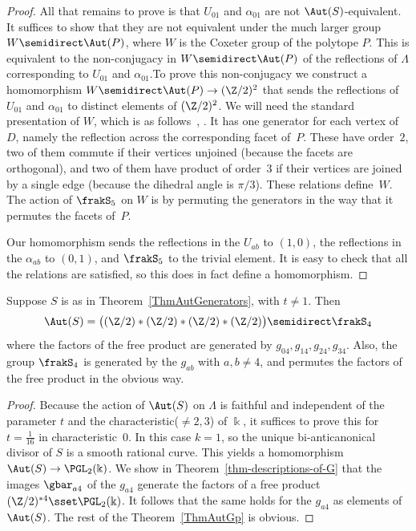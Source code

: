 \begin{proof}
All that remains to prove is that $U_{01}$ and $\alpha_{01}$ are not $\Aut(S)$-equivalent. It suffices to show that they are not equivalent under the much larger group $W\semidirect\Aut(P)$, where $W$ is the Coxeter group of the polytope $P$. This is equivalent to the non-conjugacy in $W\semidirect\Aut(P)$ of the reflections of $\Lambda$ corresponding to $U_{01}$ and $\alpha_{01}$.\linebreak To prove this non-conjugacy we construct a homomorphism $W\semidirect\Aut(P)\to(\Z/2)^2$ that sends the reflections of $U_{01}$ and $\alpha_{01}$ to distinct elements of $(\Z/2)^2$. We will need the standard presentation of $W$, which is as follows~\cite[Chapter~V, Section~4]{Bourbaki}, \cite[Theorem~2]{Vinberg2}. It has one generator for each vertex of $D$, namely the reflection across the corresponding facet of~$P$. These have order~$2$, two of them commute if their vertices unjoined (because the facets are orthogonal), and two of them have product of order~$3$ if their vertices are joined by a single edge (because the dihedral angle is $\pi/3$). These relations define~$W$. The action of $\frakS_5$ on $W$ is by permuting the generators in the way that it permutes the facets of~$P$.

Our homomorphism sends the reflections in the $U_{ab}$ to $(1,0)$, the reflections in the $\alpha_{ab}$ to $(0,1)$, and $\frakS_5$ to the trivial element. It is easy to check that all the relations are satisfied, so this does in fact define a homomorphism.
\end{proof}

\begin{theo}\label{ThmAutGp}
Suppose $S$ is as in Theorem~\ref{ThmAutGenerators}, with $t\neq1$. Then
\begin{equation}\label{eqGroupEquality}
\Aut(S)=\bigl((\Z/2)*(\Z/2)*(\Z/2)*(\Z/2)\bigr)\semidirect\frakS_4
\end{equation}
where the factors of the free product are generated by $g_{04},g_{14},g_{24},g_{34}$. Also, the group $\frakS_4$ is generated by the $g_{ab}$ with $a,b\neq4$, and permutes the factors of the free product in the obvious way.
\end{theo}

\begin{proof}
Because the action of $\Aut(S)$ on $\Lambda$ is faithful and independent of the parameter $t$ and the characteristic(${\neq}2,3$) of $\Bbbk$, it suffices to prove this for $t=\frac1{16}$ in characteristic~$0$. In this case $k=1$, so the unique bi-anticanonical divisor of $S$ is a smooth rational curve. This yields a homomorphism $\Aut(S)\to\PGL_2(\Bbbk)$. We show in Theorem~\ref{thm-descriptions-of-G} that the images $\gbar_{a4}$ of the $g_{a4}$ generate the factors of a free product $(\Z/2)^{*4}\sset\PGL_2(\Bbbk)$. It follows that the same holds for the $g_{a4}$ as elements of $\Aut(S)$. The rest of the Theorem~\ref{ThmAutGp} is obvious.
\end{proof}

